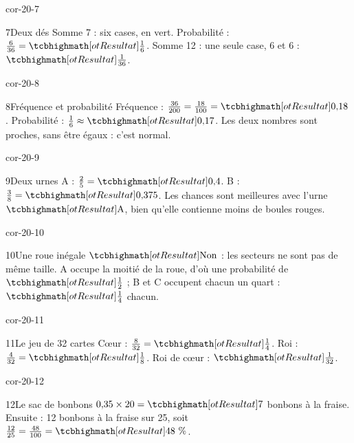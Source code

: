 \begin{blocLivre}{cor-20-7}\begin{corrige}{7}{Deux dés}
Somme 7 : six cases, en vert. Probabilité : $\frac6{36}=\res{\frac16}$. Somme 12 : une seule case, 6 et 6 : $\res{\frac1{36}}$.
\label{fig-cor-20-7}
\end{corrige}\end{blocLivre}
\begin{blocLivre}{cor-20-8}\begin{corrige}{8}{Fréquence et probabilité}
Fréquence : $\frac{36}{200}=\frac{18}{100}=\res{0{,}18}$. Probabilité : $\frac16\approx\res{0{,}17}$. Les deux nombres sont proches, sans être égaux : c’est normal.
\end{corrige}\end{blocLivre}
\begin{blocLivre}{cor-20-9}\begin{corrige}{9}{Deux urnes}
A : $\frac25=\res{0{,}4}$. B : $\frac38=\res{0{,}375}$. Les chances sont meilleures avec l’urne $\res{\text{A}}$, bien qu’elle contienne moins de boules rouges.
\label{fig-cor-20-9}
\end{corrige}\end{blocLivre}
\begin{blocLivre}{cor-20-10}\begin{corrige}{10}{Une roue inégale}
$\res{\text{Non}}$ : les secteurs ne sont pas de même taille. A occupe la moitié de la roue, d’où une probabilité de $\res{\frac12}$ ; B et C occupent chacun un quart : $\res{\frac14}$ chacun.
\label{fig-cor-20-10}
\end{corrige}\end{blocLivre}
\begin{blocLivre}{cor-20-11}\begin{corrige}{11}{Le jeu de 32 cartes}
Cœur : $\frac8{32}=\res{\frac14}$. Roi : $\frac4{32}=\res{\frac18}$. Roi de cœur : $\res{\frac1{32}}$.
\end{corrige}\end{blocLivre}
\begin{blocLivre}{cor-20-12}\begin{corrige}{12}{Le sac de bonbons}
$0{,}35\times20=\res7$ bonbons à la fraise. Ensuite : 12 bonbons à la fraise sur 25, soit $\frac{12}{25}=\frac{48}{100}=\res{48\text{~\%}}$.
\end{corrige}\end{blocLivre}
